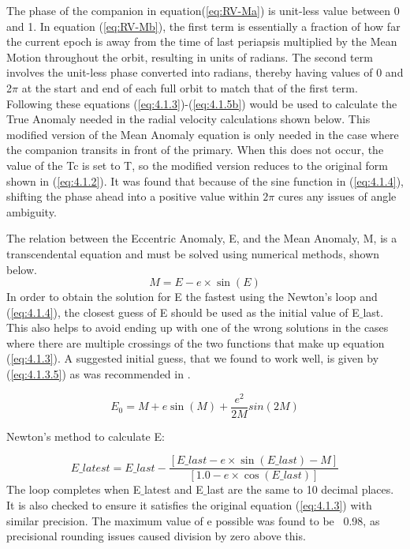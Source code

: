 \documentclass[10pt,preprint]{aastex}
\begin{document}
The phase of the companion in equation(\ref{eq:RV-Ma}) is unit-less value between 0 and 1.  In equation (\ref{eq:RV-Mb}), the first term is essentially a fraction of how far the current epoch is away from the time of last periapsis multiplied by the Mean Motion throughout the orbit, resulting in units of radians.  The second term involves the unit-less phase converted into radians, thereby having values of 0 and 2$\pi$ at the start and end of each full orbit to match that of the first term.  Following these equations (\ref{eq:4.1.3})-(\ref{eq:4.1.5b}) would be used to calculate the True Anomaly needed in the radial velocity calculations shown below.  This modified version of the Mean Anomaly equation is only needed in the case where the companion transits in front of the primary.  When this does not occur, the value of the Tc is set to T, so the modified version reduces to the original form shown in (\ref{eq:4.1.2}).
It was found that because of the sine function in (\ref{eq:4.1.4}), shifting the phase ahead into a positive value within $2\pi$ cures any issues of angle ambiguity.

The relation between the Eccentric Anomaly, E, and the Mean Anomaly, M, is a transcendental equation and must be solved using numerical methods, shown below.
\begin{equation}\label{eq:4.1.3}
M = E - e\times\sin(E)
\end{equation}
In order to obtain the solution for E the fastest using the Newton's loop and (\ref{eq:4.1.4}), the closest guess of E should be used as the initial value of E$\_$last.
  This also helps to avoid ending up with one of the wrong solutions in the
  cases where there are multiple crossings of the two functions that make up
  equation (\ref{eq:4.1.3}).  A suggested initial guess, that we found to work well, is given by (\ref{eq:4.1.3.5}) as was recommended in \citet{Argyle}.

\begin{equation}\label{eq:4.1.3.5}
E_0 = M+e\sin(M) + \frac{e^2}{2M}sin(2M)
\end{equation}

Newton's method to calculate E:
  
\begin{equation}\label{eq:4.1.4}
E\_latest = E\_last - \frac{[E\_last - e \times \sin(E\_last) - M]}{[1.0 - e \times \cos(E\_last)]}
\end{equation}
The loop completes when E$\_$latest and E$\_$last are the same to 10 decimal places.  It is also checked to ensure it satisfies the original equation (\ref{eq:4.1.3}) with similar precision.  The maximum value of e possible was found to be ~0.98, as precisional rounding issues caused division by zero above this.\\
\end{document}
